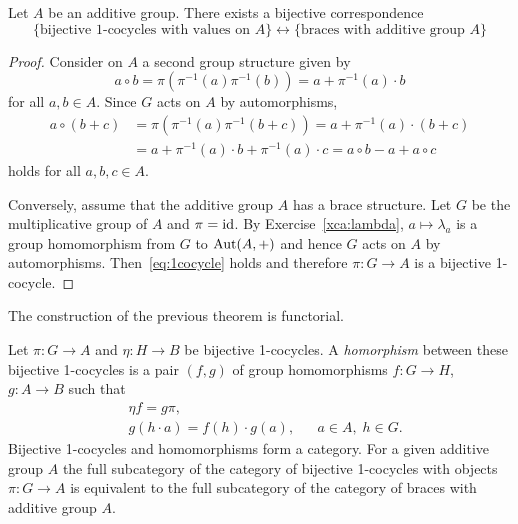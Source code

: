 \begin{theorem}
	\label{thm:1cocycle}
	Let $A$ be an additive group. There exists a bijective
	correspondence
	\[
		\{\text{bijective 1-cocycles with values on $A$}\}
	\leftrightarrow
	\{\text{braces with additive group $A$}\}
	\]

    \begin{proof}
        Consider on $A$ a second group structure given by 
        \[
		a\circ b=\pi(\pi^{-1}(a)\pi^{-1}(b))=a+\pi^{-1}(a)\cdot b
		\]
		for all
        $a,b\in A$.  Since $G$ acts on $A$ by
        automorphisms, 
        \begin{align*}
            a\circ (b+c)&=\pi(\pi^{-1}(a)\pi^{-1}(b+c))=a+\pi^{-1}(a)\cdot (b+c)\\
            &=a+ \pi^{-1}(a)\cdot b+\pi^{-1}(a)\cdot c
            =a\circ b-a+a\circ c
        \end{align*}
        holds for all $a,b,c\in A$.
        
        Conversely, assume that the additive group $A$ has a brace structure. Let $G$ be the multiplicative group of $A$
        and $\pi=\operatorname{id}$. By
        Exercise~\ref{xca:lambda}, $a\mapsto\lambda_a$ is a group homomorphism from $G$ to $\operatorname{Aut}(A,+)$ and 
        hence $G$ acts on $A$ by automorphisms. Then~\eqref{eq:1cocycle} holds
        and therefore $\pi\colon G\to A$ is a bijective 1-cocycle. 
    \end{proof}
\end{theorem}

The construction of the previous theorem is functorial.

\begin{exercise}
\label{xca:1cocycle}
Let $\pi\colon G\to A$ and $\eta\colon H\to B$ be bijective 1-cocycles.  A
\emph{homorphism} between these bijective 1-cocycles is a pair $(f,g)$ of group
homomorphisms  $f\colon G\to H$, $g\colon A\to B$ such that
\begin{align*}
&\eta f=g\pi,\\
&g(h\cdot a)=f(h)\cdot g(a),&&a\in A,\;h\in G.
\end{align*}
Bijective 1-cocycles and homomorphisms form a category. 
For a given additive group $A$ 
the full subcategory of the category of bijective 1-cocycles with objects
$\pi\colon G\to A$ is equivalent to the full subcategory of the category of
braces with additive group $A$. 
\end{exercise}





